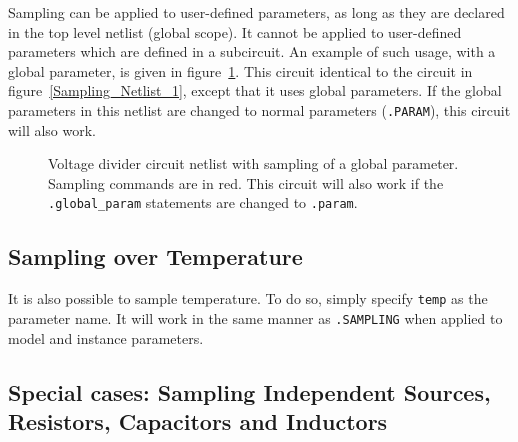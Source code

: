 Sampling can be applied to user-defined parameters, as long as they are declared in the top level netlist (global scope).  
It cannot be applied to user-defined parameters which are defined in a subcircuit.  An example of such usage, with a global parameter, is given 
in figure~\ref{Sampling_Netlist_3}. This circuit identical to the circuit in 
figure~\ref{Sampling_Netlist_1}, except that it uses global parameters.  
If the global parameters in this netlist are changed to normal parameters (\texttt{.PARAM}), this circuit will also work.
\begin{figure}[htbp]
\begin{centering}
\caption{Voltage divider circuit netlist with sampling of a global parameter.
  Sampling commands are in \color{XyceRed}red\color{black}.  This circuit will also work if the \texttt{.global\_param} statements are changed to \texttt{.param}.
\label{Sampling_Netlist_3}}
\end{centering}
\end{figure}

\subsection{Sampling over Temperature}
\label{sampling_Temperature}

It is also possible to sample temperature.  To do so, simply 
specify \verb|temp| as the parameter name.  It will work in the 
same manner as \verb|.SAMPLING| when applied to model and instance 
parameters.

\subsection{Special cases: Sampling Independent Sources, Resistors, Capacitors and Inductors}
\label{sampling_SpecialCases}

